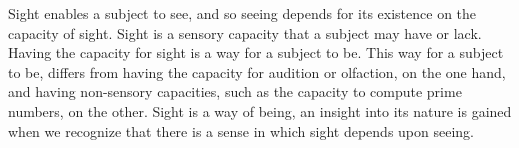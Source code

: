\documentclass[12pt]{article}
\begin{document}

Sight enables a subject to see, and so seeing depends for its existence on the capacity of sight. Sight is a sensory capacity that a subject may have or lack. Having the capacity for sight is a way for a subject to be. This way for a subject to be, differs from having the capacity for audition or olfaction, on the one hand, and having non-sensory capacities, such as the capacity to compute prime numbers, on the other. Sight is a way of being, an insight into its nature is gained when we recognize that there is a sense in which sight depends upon seeing.


 
 
\end{document}

